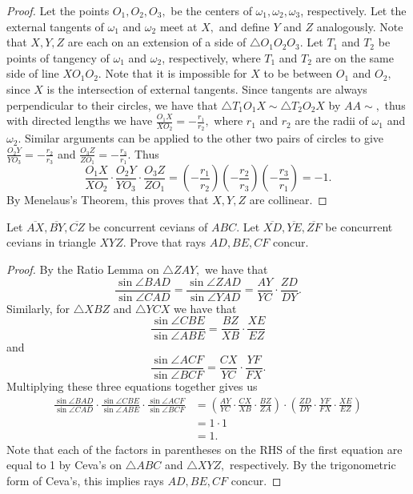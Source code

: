 \documentclass[letterpaper,oneside]{scrartcl}
\providecommand{\ol}{\overline}
\begin{document}
\begin{proof}
  Let the points $O_1,O_2,O_3,$ be the centers of $\omega_1, \omega_2, \omega_3$, respectively.
  Let the external tangents of $\omega_1$ and $\omega_2$ meet at $X,$ and define $Y$ and $Z$ analogously. Note that $X,Y,Z$ are each on an extension of a side of $\triangle O_1O_2O_3.$ Let $T_1$ and $T_2$ be points of tangency of $\omega_1$ and $\omega_2$, respectively, where $T_1$ and $T_2$ are on the same side of line $XO_1O_2.$ Note that it is impossible for $X$ to be between $O_1$ and $O_2,$ since $X$ is the intersection of external tangents. Since tangents are always perpendicular to their circles, we have that $\triangle T_1O_1X \sim \triangle T_2O_2X$ by $AA\sim,$ thus with directed lengths we have $\frac{O_1X}{XO_2} = -\frac{r_1}{r_2},$ where $r_1$ and $r_2$ are the radii of $\omega_1$ and $\omega_2.$ Similar arguments can be applied to the other two pairs of circles to give $\frac{O_2Y}{YO_3} = -\frac{r_2}{r_3}$ and $\frac{O_3Z}{ZO_1} = -\frac{r_3}{r_1}.$ Thus
  $$\frac{O_1X}{XO_2}\cdot\frac{O_2Y}{YO_3}\cdot\frac{O_3Z}{ZO_1} = \left(-\frac{r_1}{r_2}\right)\left(-\frac{r_2}{r_3}\right)\left(-\frac{r_3}{r_1}\right) = -1.$$ By Menelaus's Theorem, this proves that $X,Y,Z$ are collinear. 
\end{proof}

\begin{theorem*}
  Let $\ol{AX},\ol{BY},\ol{CZ}$ be concurrent cevians of $ABC$. Let $\ol{XD}, \ol{YE},\ol{ZF}$ be concurrent cevians in triangle $XYZ$. Prove that rays $AD,BE,CF$ concur. 
\end{theorem*}

\begin{proof}
  By the Ratio Lemma on $\triangle ZAY,$ we have that
  $$\frac{\sin\angle BAD}{\sin \angle CAD} = \frac{\sin\angle ZAD}{\sin \angle YAD} = \frac{AY}{YC}\cdot\frac{ZD}{DY}.$$
  Similarly, for $\triangle XBZ$ and $\triangle YCX$ we have that
  $$\frac{\sin\angle CBE}{\sin \angle ABE} = \frac{BZ}{XB}\cdot\frac{XE}{EZ}$$ and $$\frac{\sin\angle ACF}{\sin \angle BCF} = \frac{CX}{YC}\cdot\frac{YF}{FX}.$$
  Multiplying these three equations together gives us
  \begin{align*}
  \frac{\sin\angle BAD}{\sin \angle CAD}\cdot\frac{\sin\angle CBE}{\sin \angle ABE}\cdot\frac{\sin\angle ACF}{\sin \angle BCF} &= \left(\frac{AY}{YC}\cdot\frac{CX}{XB}\cdot\frac{BZ}{ZA}\right)\cdot\left(\frac{ZD}{DY}\cdot\frac{YF}{FX}\cdot\frac{XE}{EZ}\right)\\
  &= 1\cdot1 \\
  &= 1.
\end{align*}
  Note that each of the factors in parentheses on the RHS of the first equation are equal to 1 by Ceva's on $\triangle ABC$ and $\triangle XYZ,$ respectively. By the trigonometric form of Ceva's, this implies rays $AD,BE,CF$ concur.
\end{proof}
\end{document}
